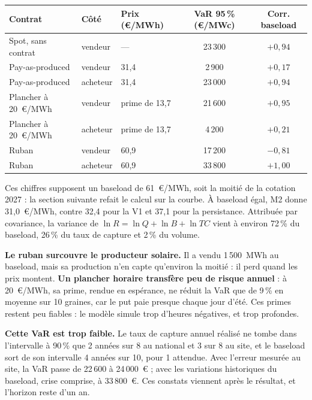 \documentclass[11pt,a4paper]{article}
\begin{document}
\begin{center}
\small
\begin{tabular}{lllcc}
\toprule
\textbf{Contrat} & \textbf{Côté} & \textbf{Prix (€/MWh)} & \textbf{VaR 95\,\% (€/MWc)} & \textbf{Corr. baseload} \\
\midrule
Spot, sans contrat & vendeur & --- & 23\,300 & $+0{,}94$ \\
Pay-as-produced & vendeur & 31,4 & 2\,900 & $+0{,}17$ \\
Pay-as-produced & acheteur & 31,4 & 23\,000 & $+0{,}94$ \\
Plancher à 20~€/MWh & vendeur & prime de 13,7 & 21\,600 & $+0{,}95$ \\
Plancher à 20~€/MWh & acheteur & prime de 13,7 & 4\,200 & $+0{,}21$ \\
Ruban & vendeur & 60,9 & 17\,200 & $-0{,}81$ \\
Ruban & acheteur & 60,9 & 33\,800 & $+1{,}00$ \\
\bottomrule
\end{tabular}
\end{center}

Ces chiffres supposent un baseload de 61~€/MWh, soit la moitié de la cotation 2027 : la section suivante refait le calcul sur la courbe. À baseload égal, M2 donne 31,0~€/MWh, contre 32,4 pour la V1 et 37,1 pour la persistance. Attribuée par covariance, la variance de $\ln R = \ln Q + \ln B + \ln TC$ vient à environ 72\,\% du baseload, 26\,\% du taux de capture et 2\,\% du volume.

\begin{aretenir}
\textbf{Le ruban surcouvre le producteur solaire.} Il a vendu 1\,500~MWh au baseload, mais sa production n'en capte qu'environ la moitié : il perd quand les prix montent. \textbf{Un plancher horaire transfère peu de risque annuel} : à 20~€/MWh, sa prime, rendue en espérance, ne réduit la VaR que de 9\,\% en moyenne sur 10 graines, car le put paie presque chaque jour d'été. Ces primes restent peu fiables : le modèle simule trop d'heures négatives, et trop profondes.
\end{aretenir}

\begin{attention}
\textbf{Cette VaR est trop faible.} Le taux de capture annuel réalisé ne tombe dans l'intervalle à 90\,\% que 2 années sur 8 au national et 3 sur 8 au site, et le baseload sort de son intervalle 4 années sur 10, pour 1 attendue. Avec l'erreur mesurée au site, la VaR passe de 22\,600 à 24\,000~€ ; avec les variations historiques du baseload, crise comprise, à 33\,800~€. Ces constats viennent après le résultat, et l'horizon reste d'un an.
\end{attention}
\end{document}
